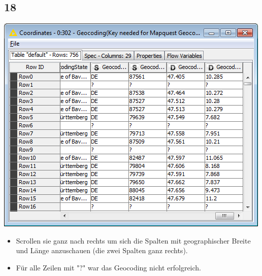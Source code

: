 \documentclass{beamer}
\begin{document}
\subsection{18}
\begin{frame}
	\begin{center}
  		\includegraphics[height=0.6\textheight]{18.png}
	\end{center}
	\begin{itemize}
		\item Scrollen sie ganz nach rechts um sich die Spalten mit geographischer Breite und Länge anzuschauen (die zwei Spalten ganz rechts).
		\item Für alle Zeilen mit "?" war das Geocoding nicht erfolgreich.
	\end{itemize}
\end{frame}
\end{document}
